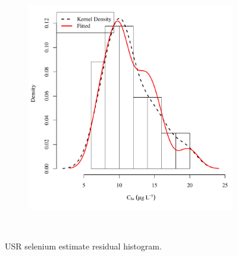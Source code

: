 \begin{linenumbers}
\begin{landscape}
\begin{figure}
\begin{subfigure}{0.7\textwidth}
			\includegraphics[width=\tableCustomSize]{"Figures/Results_USR/Stochastic/Conc Model ResDist CAN"}
		\end{subfigure}\\
		\caption{USR selenium estimate residual histogram.}
	\end{figure}
\end{landscape}


\end{linenumbers}
